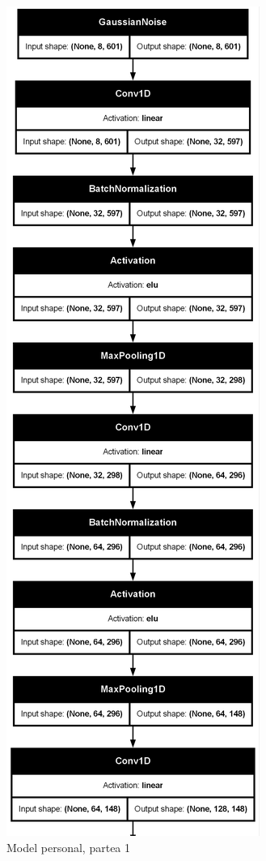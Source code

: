 \begin{figure}
    \centering
    \includegraphics[width=0.4\linewidth]{model_part1.png}
    \caption{Model personal, partea 1}
    \label{fig:model_part1}
\end{figure}

